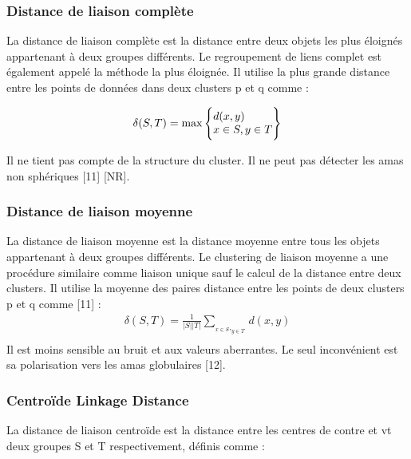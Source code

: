 \subsubsection{Distance de liaison complète}
La distance de liaison complète est la distance entre deux objets les plus éloignés appartenant à deux groupes différents. Le regroupement de liens complet est également appelé la méthode la plus éloignée. Il utilise la plus grande distance entre les points de données dans deux clusters p et q comme :

\begin{equation}
	\delta (S,T) = \max  \Bigg\{
\begin{tabular}{@{}l@{}}
   \(\displaystyle d(x,y) \)  \\
   \(\displaystyle x \in S,y \in T \) 
\end{tabular} \Bigg\}
\end{equation}

Il ne tient pas compte de la structure du cluster. Il ne peut pas détecter les amas non sphériques [11] [NR].

\subsubsection{Distance de liaison moyenne}
La distance de liaison moyenne est la distance moyenne entre tous les objets appartenant à deux groupes différents. Le clustering de liaison moyenne a une procédure similaire comme liaison unique sauf le calcul de la distance entre deux clusters. Il utilise la moyenne des paires distance entre les points de deux clusters p et q comme [11] :
\begin{equation}
	\begin{split}
		\delta (S,T) = \frac{1}{\left\lvert S \right\rvert \left\lvert T \right\rvert  } \sum_{_{ x \in S},_{y \in T}} d(x,y)  \\
	\end{split}
\end{equation}
Il est moins sensible au bruit et aux valeurs aberrantes. Le seul inconvénient est sa polarisation vers les amas globulaires [12].

\subsubsection{Centroïde Linkage Distance}
La distance de liaison centroïde est la distance entre les centres de contre et vt deux groupes S et T respectivement, définis comme :

